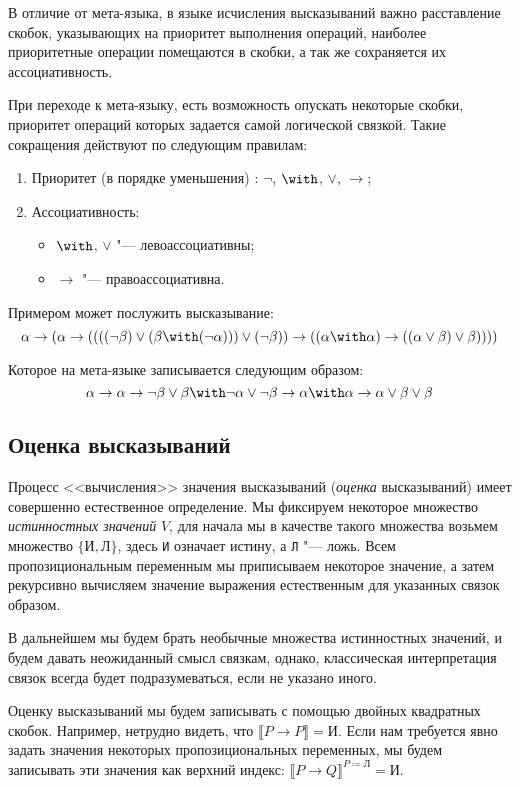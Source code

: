 В отличие от мета-языка, в языке исчисления высказываний важно расставление
скобок, указывающих на приоритет выполнения операций, наиболее приоритетные
операции помещаются в скобки, а так же сохраняется их ассоциативность.

При переходе к мета-языку, есть возможность опускать некоторые скобки, приоритет
операций которых задается самой логической связкой. Такие сокращения действуют по следующим
правилам:
\begin{enumerate}
  \item Приоритет (в порядке уменьшения) : $\neg$, $\with$, $\vee$, $\rightarrow$;
  \item Ассоциативность:
    \begin{itemize}
      \item $\with$, $\vee$ "--- левоассоциативны;
      \item $\rightarrow$ "--- правоассоциативна.
    \end{itemize}
\end{enumerate}
  
Примером может послужить высказывание:
\[\alpha\to(\alpha\to((((\neg\beta)\vee(\beta\with(\neg\alpha)))\vee(\neg\beta))\to((\alpha\with\alpha)\to((\alpha\vee\beta)\vee\beta))))\]
  
Которое на мета-языке записывается следующим образом:
\[\alpha\to\alpha\to\neg\beta\vee\beta\with\neg\alpha\vee\neg\beta\to\alpha\with\alpha\to\alpha\vee\beta\vee\beta\]


\subsection{Оценка высказываний}

Процесс <<вычисления>> значения высказываний (\emph{оценка} высказываний) имеет совершенно
естественное определение. Мы фиксируем некоторое множество
\emph{истинностных значений} $V$, для начала мы в качестве такого множества возьмем 
множество $\{\texttt{И}, \texttt{Л}\}$, здесь \texttt{И} означает истину, а
\texttt{Л} "--- ложь. Всем пропозициональным переменным мы приписываем некоторое
значение, а затем рекурсивно вычисляем значение выражения естественным для указанных
связок образом.

В дальнейшем мы будем брать необычные множества истинностных значений, и будем давать
неожиданный смысл связкам, однако, классическая интерпретация связок всегда будет
подразумеваться, если не указано иного.

Оценку высказываний мы будем записывать с помощью двойных квадратных скобок. Например,
нетрудно видеть, что $\llbracket P \rightarrow P \rrbracket = \texttt{И}$.
Если нам требуется явно задать значения некоторых пропозициональных переменных, мы будем
записывать эти значения как верхний индекс: $\llbracket P \rightarrow Q
\rrbracket ^ {P\coloneqq \texttt{Л}} = \texttt{И}$.

